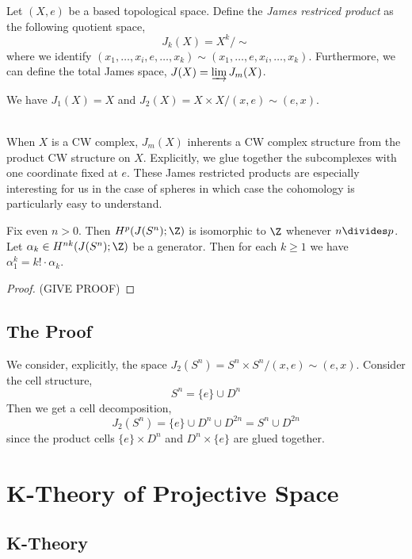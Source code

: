 \documentclass[12pt]{extarticle}
\begin{document}
\begin{defn}
Let $(X, e)$ be a based topological space. Define the \textit{James restriced product} as the following quotient space,
\[ J_k(X) = X^k / \sim \]
where we identify $(x_1, \dots, x_i, e, \dots, x_k) \sim (x_1, \dots, e, x_i, \dots, x_k)$. Furthermore, we can define the total James space, $J(X) = \varinjlim J_m(X)$. 
\end{defn}

\begin{example}
We have $J_1(X) = X$ and $J_2(X) = X \times X / (x, e) \sim (e, x)$. 
\end{example}
\noindent\\
When $X$ is a CW complex, $J_m(X)$ inherents a CW complex structure from the product CW structure on $X$. Explicitly, we glue together the subcomplexes with one coordinate fixed at $e$. These James restricted products are especially interesting for us in the case of spheres in which case the cohomology is particularly easy to understand.

\begin{theorem}
Fix even $n > 0$. Then $H^p(J(S^n); \Z)$ is isomorphic to $\Z$ whenever $n \divides p$. Let $\alpha_k \in H^{nk}(J(S^n); \Z)$ be a generator. Then for each $k \ge 1$ we have $\alpha_1^k = k! \cdot \alpha_k$. 
\end{theorem} 

\begin{proof}
(GIVE PROOF)
\end{proof}

\subsection{The Proof}

We consider, explicitly, the space $J_2(S^n) = S^n \times S^n / (x, e) \sim (e, x)$. Consider the cell structure,
\[ S^n = \{ e \} \cup D^n \] 
Then we get a cell decomposition,
\[ J_2(S^n) = \{ e \} \cup D^n \cup D^{2n} = S^n \cup D^{2n} \]
since the product cells $\{ e \} \times D^n$ and $D^n \times \{ e \}$ are glued together. 

\section{K-Theory of Projective Space}

\subsection{K-Theory}
\end{document}
